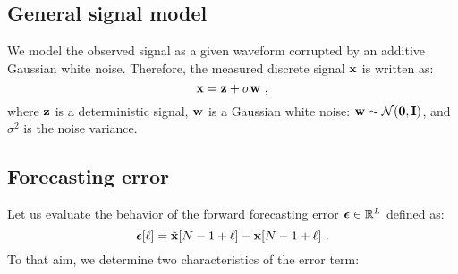 \subsection{General signal model}
We model the observed signal as a given waveform corrupted by an additive Gaussian white noise. Therefore, the measured discrete signal ${\mathbf x}$ is written as:
\[ 
{\mathbf x} = {\mathbf z} + \sigma{\mathbf w}\ ,
\]
where ${\mathbf z}$ is a deterministic signal, ${\mathbf w}$ is a Gaussian white noise: ${\mathbf w}\sim{\mathcal N}(\boldsymbol{0},{\mathbf I})$, and $\sigma^2$ is the noise variance.

\subsection{Forecasting error}
Let us evaluate the behavior of the forward forecasting error $\boldsymbol{\epsilon}\in{\mathbb R}^L$ defined as:
\[
\boldsymbol{\epsilon}[\ell] = \tilde {{\mathbf x}}[N-1+\ell]-{\mathbf x}[N-1+\ell]\ .
\]
To that aim, we determine two characteristics of the error term:
